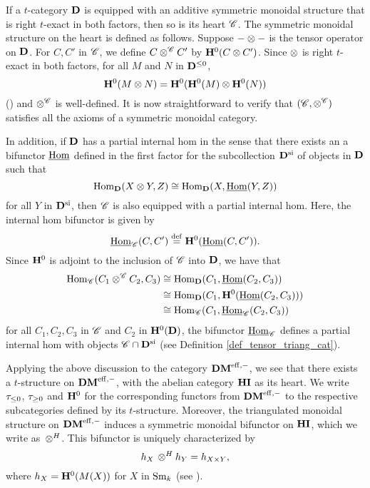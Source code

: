 If a $t$-category $\mathbf{D}$ is equipped with an additive symmetric 
monoidal structure that is right $t$-exact in both factors, then 
so is its heart $\mathscr{C}$. The symmetric monoidal structure on
the heart is defined as follows. Suppose $- \otimes -$ is the 
tensor operator on $\mathbf{D}$. For $C, C'$ in $\mathscr{C}$, we define $C 
\otimes^{\mathscr{C}} C'$ by $\mathbf{H}^0(C \otimes C')$. 
Since $\otimes$ is right $t$-exact in both factors, for all $M$ 
and $N$ in $\mathbf{D}^{\leq 0}$,
\[
\mathbf{H}^0(M \otimes N) = \mathbf{H}^0(\mathbf{H}^0(M) \otimes \mathbf{H}^0(N))
\]
(\cite[5.10]{DegModHom}) and $\otimes^{\mathscr{C}}$ is well-defined.
It is now straightforward to verify that $(\mathscr{C}, 
\otimes^{\mathscr{C}})$ satisfies all the axioms of a symmetric 
monoidal category. 

In addition, if $\mathbf{D}$ has a partial internal hom in the sense
that there exists an a bifunctor $\underline{\mathrm{Hom}}$ defined in the first 
factor for the subcollection $\mathbf{D}^{\mathrm{si}}$ of \SemiInvertible
objects in $\mathbf{D}$ such that
\[
\mathrm{Hom}_{\mathbf{D}}(X \otimes Y, Z) \cong 
   \mathrm{Hom}_{\mathbf{D}}(X, \underline{\mathrm{Hom}}(Y, Z))
\]
for all $Y$ in $\mathbf{D}^{\mathrm{si}}$, then $\mathscr{C}$ is also equipped
with a partial internal hom. Here, the internal hom bifunctor is given 
by
\[
\underline{\mathrm{Hom}}_{\mathscr{C}}(C, C') \stackrel{\mathrm{def}}{=} \mathbf{H}^0(\underline{\mathrm{Hom}}(C, C')).
\]
Since $\mathbf{H}^0$ is adjoint to the inclusion of $\mathscr{C}$ into
$\mathbf{D}$, we have that
\begin{align*}
\mathrm{Hom}_{\mathscr{C}}(C_1 \otimes^{\mathscr{C}} C_2, C_3) &\cong
\mathrm{Hom}_{\mathbf{D}}(C_1, \underline{\mathrm{Hom}}(C_2, C_3)) \\
&\cong \mathrm{Hom}_{\mathbf{D}}(C_1, \mathbf{H}^0(\underline{\mathrm{Hom}}(C_2, C_3))) \\
&\cong \mathrm{Hom}_{\mathscr{C}}(C_1, \underline{\mathrm{Hom}}_{\mathscr{C}}(C_2, C_3))
\end{align*}
for all $C_1, C_2, C_3$ in $\mathscr{C}$ and $C_2$ in $\mathbf{H}^0(\mathbf{D})$,
the bifunctor $\underline{\mathrm{Hom}}_{\mathscr{C}}$ defines a partial internal hom 
with \SemiInvertible objects $\mathscr{C} \cap \mathbf{D}^{\mathrm{si}}$ (see
Definition \ref{def_tensor_triang_cat}).

Applying the above discussion to the category $\mathbf{DM}^{\mathrm{eff},-}$, we see 
that there exists a $t$-structure on $\mathbf{DM}^{\mathrm{eff},-}$, with the abelian 
category $\mathbf{HI}$ as its heart. We write $\tau_{\leq 0}$, $\tau_{\geq 0}$
and $\mathbf{H}^0$ for the corresponding functors from $\mathbf{DM}^{\mathrm{eff},-}$ to the 
respective subcategories defined by its $t$-structure. Moreover, 
the triangulated monoidal structure on $\mathbf{DM}^{\mathrm{eff},-}$ induces a 
symmetric monoidal bifunctor on $\mathbf{HI}$, which we write as $\,\otimes^H$. 
This bifunctor is uniquely characterized by
\[
h_{X} \,\otimes^H h_{Y} = h_{X \times Y},
\]
where $h_{X} = \mathbf{H}^0(M(X))$ for $X$ in $\mathrm{Sm}_{k}$ (see 
\cite[1.8]{DegModHom}).

